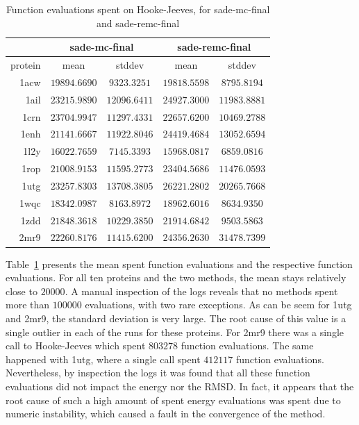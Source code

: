 \begin{table}
  \centering
  \begin{tabular}{r|c|c||c|c}
            & \multicolumn{2}{c}{sade-mc-final} & \multicolumn{2}{||c}{sade-remc-final} \\ \hline
    protein & mean         & stddev       & mean         & stddev \\ \hline \hline
    1acw    & $19894.6690$ & $9323.3251$  & $19818.5598$ & $8795.8194$  \\ \hline
    1ail    & $23215.9890$ & $12096.6411$ & $24927.3000$ & $11983.8881$ \\ \hline
    1crn    & $23704.9947$ & $11297.4331$ & $22657.6200$ & $10469.2788$ \\ \hline
    1enh    & $21141.6667$ & $11922.8046$ & $24419.4684$ & $13052.6594$ \\ \hline
    1l2y    & $16022.7659$ & $7145.3393$  & $15968.0817$ & $6859.0816$  \\ \hline
    1rop    & $21008.9153$ & $11595.2773$ & $23404.5686$ & $11476.0593$ \\ \hline
    1utg    & $23257.8303$ & $13708.3805$ & $26221.2802$ & $20265.7668$ \\ \hline
    1wqc    & $18342.0987$ & $8163.8972$  & $18962.6016$ & $8634.9350$  \\ \hline
    1zdd    & $21848.3618$ & $10229.3850$ & $21914.6842$ & $9503.5863$  \\ \hline
    2mr9    & $22260.8176$ & $11415.6200$ & $24356.2630$ & $31478.7399$ \\ \hline
  \end{tabular}
  \caption{Function evaluations spent on Hooke-Jeeves, for sade-mc-final and sade-remc-final}
  \label{tab:spent-evals}
\end{table}

Table~\ref{tab:spent-evals} presents the mean spent function evaluations and
the respective function evaluations. For all ten proteins and the two methods,
the mean stays relatively close to $20000$. A manual inspection of the logs
reveals that no methods spent more than $100000$ evaluations, with two rare
exceptions. As can be seem for 1utg and 2mr9, the standard deviation is very
large. The root cause of this value is a single outlier in each of the runs
for these proteins. For 2mr9 there was a single call to Hooke-Jeeves which spent
$803278$ function evaluations. The same happened with 1utg, where a single call
spent $412117$ function evaluations. Nevertheless, by inspection the logs it
was found that all these function evaluations did not impact the energy nor the
RMSD. In fact, it appears that the root cause of such a high amount of
spent energy evaluations was spent due to numeric instability, which caused
a fault in the convergence of the method.

